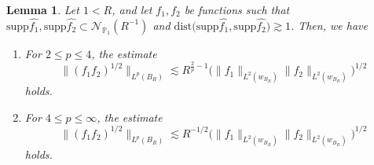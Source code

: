 \documentclass[reqno,centertags,11pt,a4paper]{amsart}
\newtheorem{lemma}[definition]{Lemma}
\begin{document}
\begin{lemma}\label{bilnear}
Let $1<R$, and let $f_1,f_2$ be functions such that $\text{supp}\widehat{f_1},\text{supp}\widehat{f_2}\subset\mathcal{N}_{\mathbb{P}_1}(R^{-1})$ and $\text{dist}\bigl(\text{supp}\widehat{f_1},\text{supp}\widehat{f_2}\bigr)\gtrsim 1$. Then, we have
\begin{enumerate}
    \item For $2\leq p\leq4$, the estimate
    \begin{equation}\label{bil}
        \|(f_1f_2)^{1/2}\|_{L^p(B_R)}\lesssim R^{\frac{2}{p}-1}\bigl(\|f_1\|_{L^2(w_{B_R})}\|f_2\|_{L^2(w_{B_R})}\bigr)^{1/2}
    \end{equation}
    holds.
    \item For $4\leq p\leq\infty$, the estimate
    \begin{equation}\label{bil1}
        \|(f_1f_2)^{1/2}\|_{L^p(B_R)}\lesssim R^{-1/2}\bigl(\|f_1\|_{L^2(w_{B_R})}\|f_2\|_{L^2(w_{B_R})}\bigr)^{1/2}
    \end{equation}
    holds.
\end{enumerate}
\end{lemma}
\end{document}
